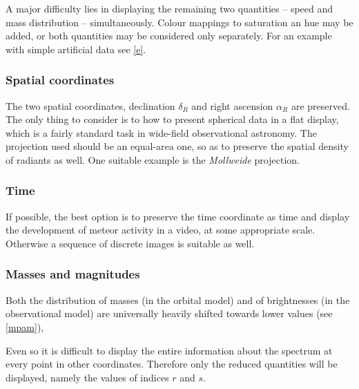        A major difficulty lies in displaying the remaining two quantities -- speed and mass distribution -- simultaneously.
        Colour mappings to saturation an hue may be added, or both quantities may be considered only separately.
        For an example with simple artificial data see \cref{e}.

        \subsubsection{Spatial coordinates} \label{iovs}
            The two spatial coordinates, declination $\delta_R$ and right ascension $\alpha_R$ are preserved.
            The only thing to consider is to how to present spherical data in a flat display,
            which is a fairly standard task in wide-field observational astronomy.
            The projection used should be an equal-area one, so as to preserve the spatial density of radiants as well.
            One suitable example is the \emph{Mollweide} projection.


        \subsubsection{Time} \label{iovt}
            If possible, the best option is to preserve the time coordinate as time
            and display the development of meteor activity in a video, at some appropriate scale.
            Otherwise a sequence of discrete images is suitable as well.

        \subsubsection{Masses and magnitudes} \label{iovm}
            Both the distribution of masses (in the orbital model) and of brightnesses (in the observational model)
            are universally heavily shifted towards lower values (see \cref{mpam}),

            Even so it is difficult to display the entire information about the spectrum at every point
            in other coordinates. Therefore only the reduced quantities will be displayed,
            namely the values of indices $r$ and $s$.

